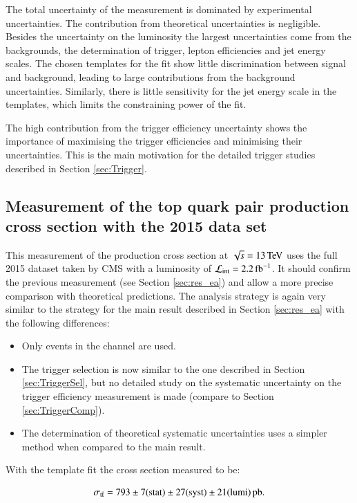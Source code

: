 The total uncertainty of the measurement is dominated by experimental uncertainties. The contribution from theoretical uncertainties is negligible.
Besides the uncertainty on the luminosity the largest uncertainties come from the backgrounds, the determination of trigger, lepton efficiencies and jet energy scales.
The chosen templates for the fit show little discrimination between signal and background, leading to large contributions from the background uncertainties.
Similarly, there is little sensitivity for the jet energy scale in the templates, which limits the constraining power of the fit.

The high contribution from the trigger efficiency uncertainty shows the importance of maximising the trigger efficiencies and minimising their uncertainties.
This is the main motivation for the detailed trigger studies described in Section \ref{sec:Trigger}. 

\subsection{Measurement of the top quark pair production cross section with the 2015 data set}
\label{sec:res_2015}

This measurement of the \ttbar production cross section at $\sqrt{s}=13\,\text{Te\hspace{-.08em}V}$ uses the full 2015 dataset taken by CMS with a luminosity of $\mathcal{L}_{\mathrm{int}}= 2.2 \mbox{\ensuremath{\,\text{fb}^\text{$-$1}}}$.
It should confirm the previous measurement (see Section \ref{sec:res_ea}) and allow a more precise comparison with theoretical predictions.
The analysis strategy is again very similar to the strategy for the main result described in Section \ref{sec:res_ea} with the following differences:

\begin{itemize}
\item Only events in the \emu channel are used.
\item The trigger selection is now similar to the one described in Section \ref{sec:TriggerSel}, but no detailed study on the systematic uncertainty on the trigger efficiency measurement is made (compare to Section \ref{sec:TriggerComp}).
\item The determination of theoretical systematic uncertainties uses a simpler method when compared to the main result.
\end{itemize}

With the template fit the \ttbar cross section measured to be:

\begin{equation}
\sigma_{\mathrm{t}\bar{\mathrm{t}}} = 793 \pm  7 ({\rm stat}) \pm 27 ({\rm syst}) \pm 21 ({\rm lumi}) \mbox{\ensuremath{\,\text{pb}}} .
\end{equation}


